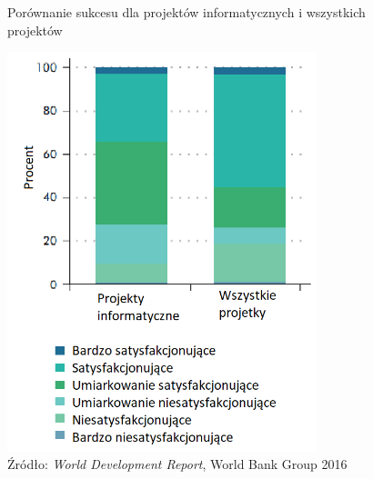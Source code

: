 \begin{figure}
\centering
\caption{Porównanie sukcesu dla projektów informatycznych i wszystkich projektów}
\includegraphics[width=9cm]{img/wdr2_PL.png}
\caption*{Źródło: \textit{World Development Report}, World Bank Group 2016}
\end{figure}